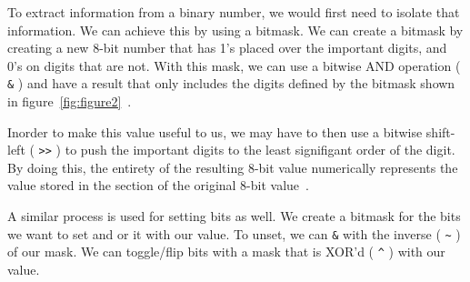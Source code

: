 \documentclass[12pt]{article}
\newcommand{\singlespace}{
  \protect\renewcommand\baselinestretch{1.0}
  \protect\normalsize
}
\begin{document}
To extract information from a binary number, we would first need to isolate that information. We can
achieve this by using a bitmask. We can create a bitmask by creating a new 8-bit number that has
1's placed over the important digits, and 0's on digits that are not. With this mask, we can use a
bitwise AND operation ( \lstinline{&} ) and have a result that only includes the digits defined by the bitmask shown in figure~\ref{fig:figure2}~\cite{bitmasks}.

Inorder to make this value useful to us, we may have to then use a bitwise shift-left ( \lstinline{>>} ) to push
the important digits to the least signifigant order of the digit. By doing this, the entirety of the
resulting 8-bit value numerically represents the value stored in the section of the original 8-bit
value~\cite{bitmasks}.

A similar process is used for setting bits as well. We create a bitmask for the bits we want to set
and or it with our value. To unset, we can \lstinline{&} with the inverse ( \lstinline{~} ) of our mask.
We can toggle/flip bits with a mask that is XOR'd ( \lstinline{^} ) with our value.

\singlespace




\end{document}
